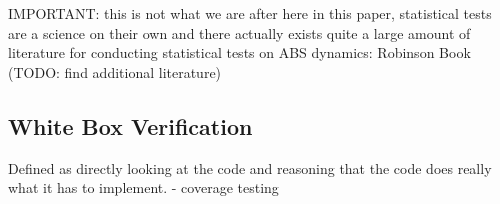 IMPORTANT: this is not what we are after here in this paper, statistical tests are a science on their own and there actually exists quite a large amount of literature for conducting statistical tests on ABS dynamics: Robinson Book (TODO: find additional literature)	

\subsection{White Box Verification}
Defined as directly looking at the code and reasoning that the code does really what it has to implement.
- coverage testing

